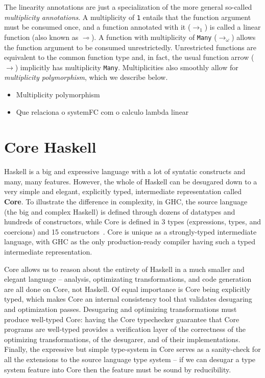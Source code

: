 \documentclass[]{lwnovathesis}
\newcommand{\lolli}{\multimap}
\begin{document}
The linearity annotations are just a specialization of the more general so-called
\emph{multiplicity annotations}. A multiplicity of \texttt{1} entails that the
function argument must be consumed once, and a function annotated with it
($\to_1$) is called a linear function (also known as $\lolli$). A function with
multiplicity of \texttt{Many} ($\to_\omega$) allows the function argument to
be consumed unrestrictedly. Unrestricted functions are equivalent to the common
function type and, in fact, the usual function arrow ($\to$) implicitly has
multiplicity \texttt{Many}.  Multiplicities also smoothly allow for
\emph{multiplicity polymorphism}, which we describe below.


\begin{itemize}
    \item Multiplicity polymorphism
    \item Que relaciona o systemFC com o calculo lambda linear
\end{itemize}

\section{Core Haskell\label{core-section}}

Haskell is a big and expressive language with a lot of syntatic constructs and
many, many features. However, the whole of Haskell can be desugared down to a
very simple and elegant, explicitly typed, intermediate representation called
\textbf{Core}. To illustrate the difference in complexity, in GHC, the source
language (the big and complex Haskell) is defined through dozens of datatypes
and hundreds of constructors, while Core is defined in 3 types (expressions,
types, and coercions) and 15 constructors~\cite{}.
%
Core is unique as a strongly-typed intermediate language, with GHC as the only
production-ready compiler having such a typed intermediate representation.

Core allows us to reason about the entirety of Haskell in a much smaller and
elegant language -- analysis, optimizating transformations, and code generation
are all done on Core, not Haskell.
%
Of equal importance is Core being explicitly typed, which makes Core an internal
consistency tool that validates desugaring and optimization passes. Desugaring
and optimizing transformations must produce well-typed Core: having the Core
typechecker guarantee that Core programs are well-typed provides a verification
layer of the correctness of the optimizing transformations, of the desugarer,
and of their implementations.
%
Finally, the expressive but simple type-system in Core serves as a sanity-check
for all the extensions to the source language type system -- if we can desugar a
type system feature into Core then the feature must be sound by reducibility.
\end{document}
